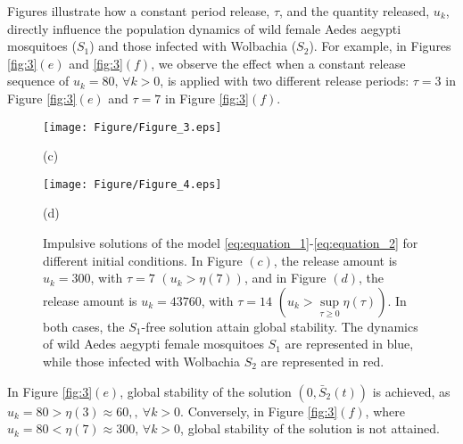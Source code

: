 \documentclass[10pt,letterpaper]{article}
\begin{document}
Figures illustrate how a constant period release, $\tau$, and the quantity released, $u_k$, directly influence the population dynamics of wild female Aedes aegypti mosquitoes ($S_1$) and those infected with Wolbachia ($S_2$). For example, in Figures \eqref{fig:3}$(e)$ and \eqref{fig:3}$(f)$, we observe the effect when a constant release sequence of $u_k = 80, \, \forall k > 0$, is applied with two different release periods: $\tau = 3$ in Figure \eqref{fig:3}$(e)$ and $\tau = 7$ in Figure \eqref{fig:3}$(f)$. 
\begin{figure}[!ht]
    \centering
    \begin{minipage}{0.45\textwidth}
        \centering
        \texttt{[image: Figure/Figure\_3.eps]}
        \par\vspace{2pt} (c)
    \end{minipage}
    \hfill
    \begin{minipage}{0.45\textwidth}
        \centering
        \texttt{[image: Figure/Figure\_4.eps]}
        \par\vspace{2pt} (d)
    \end{minipage}
   \caption{Impulsive solutions of the model \eqref{eq:equation_1}-\eqref{eq:equation_2} for different initial conditions. In Figure $(c)$, the release amount is $u_k = 300$, with $\tau=7$ $(u_k>\eta(7))$, and in Figure $(d)$, the release amount is $u_k = 43760$, with $\tau=14$ $\left(u_k>\sup\limits_{\tau \geq 0} \eta(\tau)\right)$. In both cases, the $S_1$-free solution attain global stability. The dynamics of wild Aedes aegypti female mosquitoes $S_1$ are represented in blue, while those infected with Wolbachia $S_2$ are represented in red.}

    \label{fig:2}
\end{figure}
\noindent In Figure \eqref{fig:3}$(e)$, global stability of the solution $(0, \bar{S}_2(t))$ is achieved, as $u_k = 80 > \eta(3) \approx 60, ,\ \forall k > 0$. Conversely, in Figure \eqref{fig:3}$(f)$, where $u_k = 80 < \eta(7) \approx 300, \, \forall k > 0$, global stability of the solution is not attained.
\end{document}
